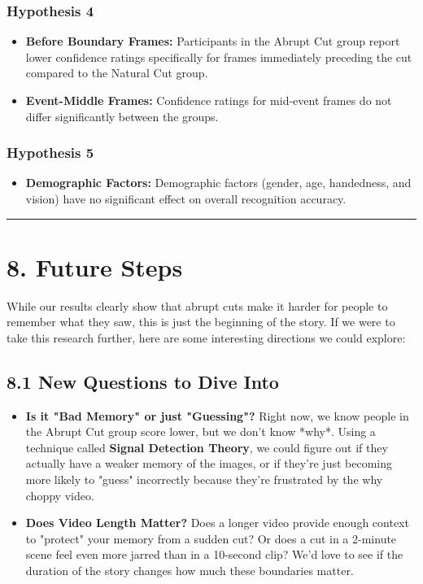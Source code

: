 \documentclass[10pt,a4paper]{article}
\begin{document}
\subsubsection{Hypothesis 4}
\begin{itemize}
    \item \textbf{Before Boundary Frames:} Participants in the Abrupt Cut group report lower confidence ratings specifically for frames immediately preceding the cut compared to the Natural Cut group.
    \item \textbf{Event-Middle Frames:} Confidence ratings for mid-event frames do not differ significantly between the groups.
\end{itemize}

\subsubsection{Hypothesis 5}
\begin{itemize}
    \item \textbf{Demographic Factors:} Demographic factors (gender, age, handedness, and vision) have no significant effect on overall recognition accuracy.
\end{itemize}

\rule{\linewidth}{0.4pt}

\section{8. Future Steps}
While our results clearly show that abrupt cuts make it harder for people to remember what they saw, this is just the beginning of the story. If we were to take this research further, here are some interesting directions we could explore:

\subsection{8.1 New Questions to Dive Into}
\begin{itemize}
    \item \textbf{Is it "Bad Memory" or just "Guessing"?} Right now, we know people in the Abrupt Cut group score lower, but we don't know *why*. Using a technique called \textbf{Signal Detection Theory}, we could figure out if they actually have a weaker memory of the images, or if they're just becoming more likely to "guess" incorrectly because they're frustrated by the why choppy video.
    \item \textbf{Does Video Length Matter?} Does a longer video provide enough context to "protect" your memory from a sudden cut? Or does a cut in a 2-minute scene feel even more jarred than in a 10-second clip? We'd love to see if the duration of the story changes how much these boundaries matter.
\end{itemize}
\end{document}
